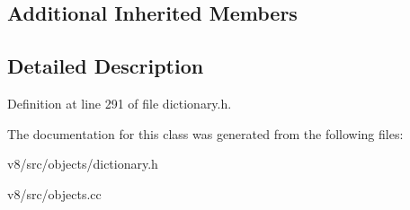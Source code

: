 \subsection*{Additional Inherited Members}


\subsection{Detailed Description}


Definition at line 291 of file dictionary.\+h.



The documentation for this class was generated from the following files\+:\begin{DoxyCompactItemize}
\item 
v8/src/objects/dictionary.\+h\item 
v8/src/objects.\+cc\end{DoxyCompactItemize}
